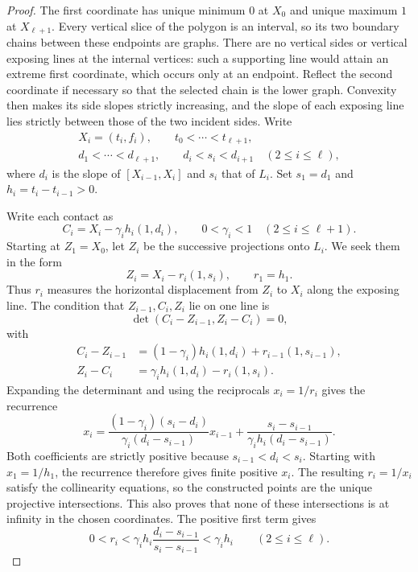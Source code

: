 \documentclass[11pt,a4paper]{article}
\theoremstyle{definition}
\theoremstyle{remark}
\numberwithin{equation}{section}
\begin{document}
\begin{proof}
The first coordinate has unique minimum $0$ at $X_0$ and unique maximum $1$ at $X_{\ell+1}$. Every vertical slice of the polygon is an interval, so its two boundary chains between these endpoints are graphs. There are no vertical sides or vertical exposing lines at the internal vertices: such a supporting line would attain an extreme first coordinate, which occurs only at an endpoint. Reflect the second coordinate if necessary so that the selected chain is the lower graph. Convexity then makes its side slopes strictly increasing, and the slope of each exposing line lies strictly between those of the two incident sides. Write
\[
 \begin{gathered}
 X_i=(t_i,f_i),\qquad t_0<\cdots<t_{\ell+1},\\
 d_1<\cdots<d_{\ell+1},\qquad d_i<s_i<d_{i+1}\quad(2\le i\le\ell),
 \end{gathered}
\]
where $d_i$ is the slope of $[X_{i-1},X_i]$ and $s_i$ that of $L_i$. Set $s_1=d_1$ and $h_i=t_i-t_{i-1}>0$.

Write each contact as
\[
 C_i=X_i-\gamma_i h_i(1,d_i),\qquad 0<\gamma_i<1
 \quad(2\le i\le\ell+1).
\]
Starting at $Z_1=X_0$, let $Z_i$ be the successive projections onto $L_i$. We seek them in the form
\[
 Z_i=X_i-r_i(1,s_i),\qquad r_1=h_1.
\]
Thus $r_i$ measures the horizontal displacement from $Z_i$ to $X_i$ along the exposing line. The condition that $Z_{i-1},C_i,Z_i$ lie on one line is
\[
 \det(C_i-Z_{i-1},Z_i-C_i)=0,
\]
with
\[
 \begin{split}
 C_i-Z_{i-1}&=(1-\gamma_i)h_i(1,d_i)+r_{i-1}(1,s_{i-1}),\\
 Z_i-C_i&=\gamma_i h_i(1,d_i)-r_i(1,s_i).
 \end{split}
\]
Expanding the determinant and using the reciprocals $x_i=1/r_i$ gives the recurrence
\begin{equation}\label{eq:positive-transfer}
 x_i=\frac{(1-\gamma_i)(s_i-d_i)}{\gamma_i(d_i-s_{i-1})}x_{i-1}
       +\frac{s_i-s_{i-1}}{\gamma_i h_i(d_i-s_{i-1})}.
\end{equation}
Both coefficients are strictly positive because $s_{i-1}<d_i<s_i$. Starting with $x_1=1/h_1$, the recurrence therefore gives finite positive $x_i$. The resulting $r_i=1/x_i$ satisfy the collinearity equations, so the constructed points are the unique projective intersections. This also proves that none of these intersections is at infinity in the chosen coordinates. The positive first term gives
\[
 0<r_i<\gamma_i h_i\frac{d_i-s_{i-1}}{s_i-s_{i-1}}
          <\gamma_i h_i\qquad(2\le i\le\ell).
\]


\end{proof}
\end{document}
